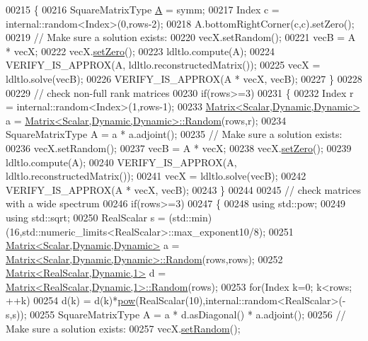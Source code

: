 \begin{DoxyCode}
00215     \{
00216       SquareMatrixType \hyperlink{group___core___module_class_eigen_1_1_matrix}{A} = symm;
00217       Index c = internal::random<Index>(0,rows-2);
00218       A.bottomRightCorner(c,c).setZero();
00219       \textcolor{comment}{// Make sure a solution exists:}
00220       vecX.setRandom();
00221       vecB = A * vecX;
00222       vecX.\hyperlink{class_eigen_1_1_plain_object_base_ac21ad5f989f320e46958b75ac8d9a1da}{setZero}();
00223       ldltlo.compute(A);
00224       VERIFY\_IS\_APPROX(A, ldltlo.reconstructedMatrix());
00225       vecX = ldltlo.solve(vecB);
00226       VERIFY\_IS\_APPROX(A * vecX, vecB);
00227     \}
00228 
00229     \textcolor{comment}{// check non-full rank matrices}
00230     \textcolor{keywordflow}{if}(rows>=3)
00231     \{
00232       Index r = internal::random<Index>(1,rows-1);
00233       \hyperlink{group___core___module}{Matrix<Scalar,Dynamic,Dynamic>} a = 
      \hyperlink{group___core___module_class_eigen_1_1_matrix}{Matrix<Scalar,Dynamic,Dynamic>::Random}(rows,r);
00234       SquareMatrixType A = a * a.adjoint();
00235       \textcolor{comment}{// Make sure a solution exists:}
00236       vecX.setRandom();
00237       vecB = A * vecX;
00238       vecX.\hyperlink{class_eigen_1_1_plain_object_base_ac21ad5f989f320e46958b75ac8d9a1da}{setZero}();
00239       ldltlo.compute(A);
00240       VERIFY\_IS\_APPROX(A, ldltlo.reconstructedMatrix());
00241       vecX = ldltlo.solve(vecB);
00242       VERIFY\_IS\_APPROX(A * vecX, vecB);
00243     \}
00244 
00245     \textcolor{comment}{// check matrices with a wide spectrum}
00246     \textcolor{keywordflow}{if}(rows>=3)
00247     \{
00248       \textcolor{keyword}{using} std::pow;
00249       \textcolor{keyword}{using} std::sqrt;
00250       RealScalar s = (std::min)(16,std::numeric\_limits<RealScalar>::max\_exponent10/8);
00251       \hyperlink{group___core___module}{Matrix<Scalar,Dynamic,Dynamic>} a = 
      \hyperlink{group___core___module_class_eigen_1_1_matrix}{Matrix<Scalar,Dynamic,Dynamic>::Random}(rows,rows);
00252       \hyperlink{group___core___module}{Matrix<RealScalar,Dynamic,1>} d =  
      \hyperlink{group___core___module_class_eigen_1_1_matrix}{Matrix<RealScalar,Dynamic,1>::Random}(rows);
00253       \textcolor{keywordflow}{for}(Index k=0; k<rows; ++k)
00254         d(k) = d(k)*\hyperlink{group___core___module_ab6dc101d82e8228a19a8840e3a29c1c9}{pow}(RealScalar(10),internal::random<RealScalar>(-s,s));
00255       SquareMatrixType A = a * d.asDiagonal() * a.adjoint();
00256       \textcolor{comment}{// Make sure a solution exists:}
00257       vecX.\hyperlink{class_eigen_1_1_plain_object_base_af0e576a0e1aefc9ee346de44cc352ba3}{setRandom}();

\end{DoxyCode}
